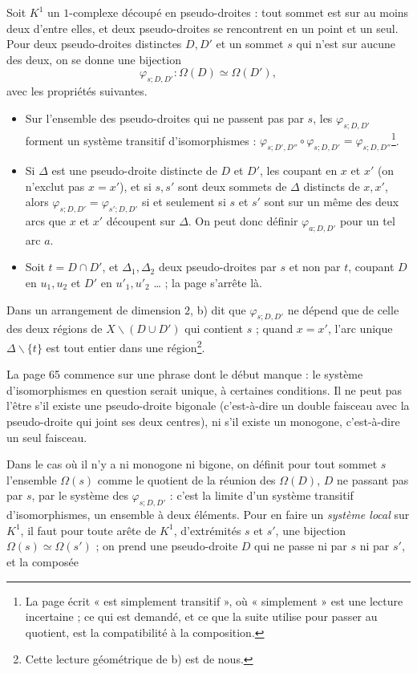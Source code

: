 \documentclass[11pt,a4paper]{article}
\begin{document}
Soit $K^1$ un $1$-complexe découpé en pseudo-droites : tout sommet est sur au
moins deux d'entre elles, et deux pseudo-droites se rencontrent en un point et
un seul. Pour deux pseudo-droites distinctes $D, D'$ et un sommet $s$ qui
n'est sur aucune des deux, on se donne une bijection
\[
\varphi_{s;D,D'} : \Omega(D) \simeq \Omega(D'),
\]
avec les propriétés suivantes.
\begin{itemize}
  \item[a)] Sur l'ensemble des pseudo-droites qui ne passent pas par $s$, les
  $\varphi_{s;D,D'}$ forment un système transitif d'isomorphismes :
  $\varphi_{s;D',D''} \circ \varphi_{s;D,D'} = \varphi_{s;D,D''}$\footnote{La
  page écrit « est simplement transitif », où « simplement » est une lecture
  incertaine ; ce qui est demandé, et ce que la suite utilise pour passer au
  quotient, est la compatibilité à la composition.}.
  \item[b)] Si $\Delta$ est une pseudo-droite distincte de $D$ et $D'$, les
  coupant en $x$ et $x'$ (on n'exclut pas $x = x'$), et si $s, s'$ sont deux
  sommets de $\Delta$ distincts de $x, x'$, alors $\varphi_{s;D,D'} =
  \varphi_{s';D,D'}$ si et seulement si $s$ et $s'$ sont sur un même des deux
  arcs que $x$ et $x'$ découpent sur $\Delta$. On peut donc définir
  $\varphi_{a;D,D'}$ pour un tel arc $a$.
  \item[c)] Soit $t = D \cap D'$, et $\Delta_1, \Delta_2$ deux pseudo-droites par $s$
  et non par $t$, coupant $D$ en $u_1, u_2$ et $D'$ en $u'_1, u'_2$ \ldots{} ;
  la page s'arrête là.
\end{itemize}
Dans un arrangement de dimension $2$, b) dit que $\varphi_{s;D,D'}$ ne dépend
que de celle des deux régions de $X \smallsetminus (D \cup D')$ qui contient
$s$ ; quand $x = x'$, l'arc unique $\Delta \smallsetminus \{t\}$ est tout
entier dans une région\footnote{Cette lecture géométrique de b) est de
nous.}.

La page 65 commence sur une phrase dont le début manque : le système
d'isomorphismes en question serait unique, à certaines conditions. Il ne
peut pas l'être s'il existe une pseudo-droite bigonale (c'est-à-dire un
double faisceau avec la pseudo-droite qui joint ses deux centres), ni
s'il existe un monogone, c'est-à-dire un seul faisceau.

Dans le cas où il n'y a ni monogone ni bigone, on définit pour tout sommet
$s$ l'ensemble $\Omega(s)$ comme le quotient de la réunion des $\Omega(D)$,
$D$ ne passant pas par $s$, par le système des $\varphi_{s;D,D'}$ : c'est la
limite d'un système transitif d'isomorphismes, un ensemble à deux éléments.
Pour en faire un \emph{système local} sur $K^1$, il faut pour toute arête de
$K^1$, d'extrémités $s$ et $s'$, une bijection $\Omega(s) \simeq \Omega(s')$ ;
on prend une pseudo-droite $D$ qui ne passe ni par $s$ ni par $s'$, et la
composée
\end{document}
